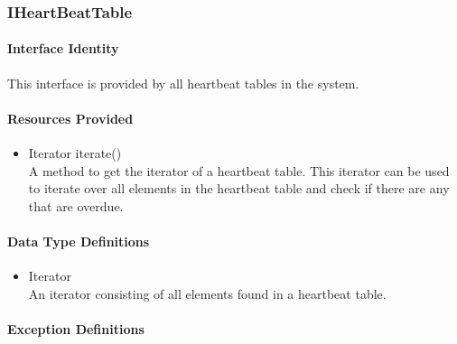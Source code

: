 \subsubsection{IHeartBeatTable}
\paragraph{Interface Identity}
This interface is provided by all heartbeat tables in the system.
\paragraph{Resources Provided}
\begin{itemize}
	\item{Iterator iterate()}\\
	A method to get the iterator of a heartbeat table. This iterator
		can be used to iterate over all elements in the heartbeat table
		and check if there are any that are overdue.
\end{itemize}
\paragraph{Data Type Definitions}
\begin{itemize}
	\item Iterator\\
	An iterator consisting of all elements found in a heartbeat table.
\end{itemize}
\paragraph{Exception Definitions}
